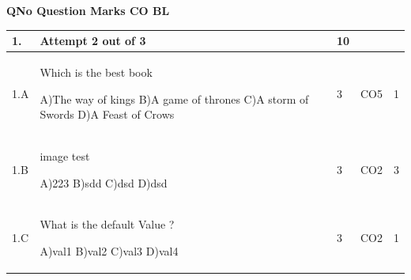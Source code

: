 \documentclass[12pt]{article}
\begin{document}
	\begin{flushleft}
	\bf{QNo}\hspace{1.2cm} \bf{Question} \hspace{5.5cm}  \bf{Marks} \hspace{0.2cm} \bf{CO} \hspace{0.2cm}	\bf{BL}	
	
\end{flushleft} 
	\begin{longtable}{|L{1cm}|L{8cm}|C{1cm}|C{1cm}|C{1cm}|}\hline
		\bf{1}. & \bf{Attempt} \bf2 \bf{out} of \bf3 & \bf10  & & \\ \hline
				1.A & Which is the best book \newline
					
		A)The way of kings\newline
		B)A game of thrones\newline
		C)A storm of Swords\newline
		D)A Feast of Crows &
		3 &
		CO5&
		1 \\ \hline
		
				1.B & image test \newline
					
		A)223\newline
		B)sdd\newline
		C)dsd\newline
		D)dsd &
		3 &
		CO2&
		3 \\ \hline
		
				1.C & What is the default Value ? \newline
					
		A)val1\newline
		B)val2\newline
		C)val3\newline
		D)val4 &
		3 &
		CO2&
		1 \\ \hline
		
		
	\end{longtable}
\end{document}
